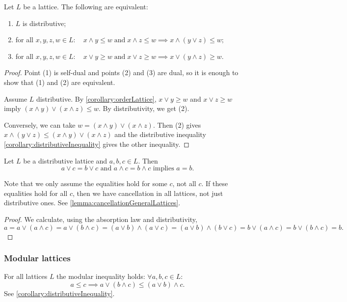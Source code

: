 \begin{lemma}
Let $L$ be a lattice. The following are equivalent:
\begin{enumerate}
\item $L$ is distributive;
\item for all $x,y,z,w\in L: \quad x\wedge y \leq w \;\text{and}\; x\wedge z\leq w \implies x\wedge (y\vee z) \leq w;$
\item for all $x,y,z,w\in L: \quad x\vee y \geq w \;\text{and}\; x\vee z\geq w \implies x\vee (y\wedge z) \geq w$.
\end{enumerate}
\end{lemma}
\begin{proof}
Point (1) is self-dual and points (2) and (3) are dual, so it is enough to show that (1) and (2) are equivalent.

Assume $L$ distributive. By \ref{corollary:orderLattice}, $ x\vee y \geq w$ and $x\vee z\geq w$ imply $(x\wedge y)\vee (x\wedge z) \leq w$. By distributivity, we get (2).

Conversely, we can take $w = (x\wedge y)\vee (x\wedge z)$. Then (2) gives $x\wedge (y\vee z) \leq (x\wedge y)\vee (x\wedge z)$ and the distributive inequality \ref{corollary:distributiveInequality} gives the other inequality. 
\end{proof}

\begin{proposition} \label{prop:cancellationDistributiveLattices}
Let $L$ be a distributive lattice and $a,b,c\in L$. Then
\[ \text{$a\vee c = b \vee c$ and $a\wedge c = b \wedge c$ implies $a = b$.} \]
\end{proposition}
Note that we only assume the equalities hold for some $c$, not all $c$. If these equalities hold for all $c$, then we have cancellation in all lattices, not just distributive ones. See \ref{lemma:cancellationGeneralLattices}.
\begin{proof}
We calculate, using the absorption law and distributivity,
\[ a = a\vee (a\wedge c) = a \vee (b\wedge c) = (a\vee b)\wedge (a\vee c) = (a\vee b) \wedge (b\vee c) = b \vee (a \wedge c) = b \vee (b\wedge c) = b. \]
\end{proof}

\subsubsection{Modular lattices}
For all lattices $L$ the modular inequality holds: $\forall a,b,c \in L$:
\[ a\leq c \implies a \vee (b\wedge c) \leq (a\vee b) \wedge c. \]
See \ref{corollary:distributiveInequality}.

